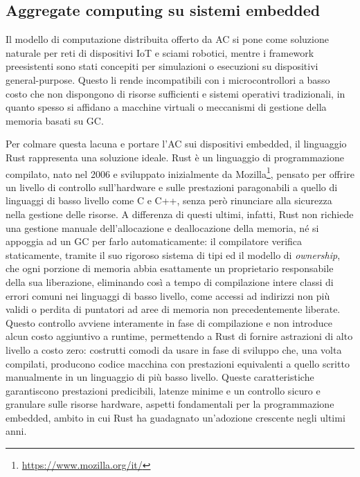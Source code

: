 \subsection{Aggregate computing su sistemi embedded}
\label{ssec:ac-on-embedded-devices}

Il modello di computazione distribuita offerto da \ac{AC} si pone come soluzione
naturale per reti di dispositivi \ac{IoT} e sciami robotici, mentre i framework
preesistenti sono stati concepiti per simulazioni o esecuzioni su dispositivi
general-purpose.
Questo li rende incompatibili con i microcontrollori a basso costo che non dispongono
di risorse sufficienti e sistemi operativi tradizionali, in quanto spesso si
affidano a macchine virtuali o meccanismi di gestione della memoria basati su \ac{GC}.

Per colmare questa lacuna e portare l'\ac{AC} sui dispositivi embedded, il linguaggio
Rust rappresenta una soluzione ideale.
Rust è un linguaggio di programmazione compilato, nato nel 2006 e sviluppato
inizialmente da Mozilla\footnote{\url{https://www.mozilla.org/it/}}, pensato per
offrire un livello di controllo sull'hardware e sulle prestazioni paragonabili a
quello di linguaggi di basso livello come C e C++, senza però rinunciare alla sicurezza
nella gestione delle risorse.
A differenza di questi ultimi, infatti, Rust non richiede una gestione manuale
dell'allocazione e deallocazione della memoria, né si appoggia ad un \ac{GC}
per farlo automaticamente: il compilatore verifica staticamente, tramite il suo
rigoroso sistema di tipi ed il modello di \emph{ownership}, che ogni porzione di
memoria abbia esattamente un proprietario responsabile della sua liberazione,
eliminando così a tempo di compilazione intere classi di errori comuni nei
linguaggi di basso livello, come accessi ad indirizzi non più validi o perdita
di puntatori ad aree di memoria non precedentemente liberate.
Questo controllo avviene interamente in fase di compilazione e non introduce
alcun costo aggiuntivo a runtime, permettendo a Rust di fornire astrazioni di
alto livello a costo zero: costrutti comodi da usare in fase di sviluppo che,
una volta compilati, producono codice macchina con prestazioni equivalenti a
quello scritto manualmente in un linguaggio di più basso livello.
Queste caratteristiche garantiscono prestazioni predicibili, latenze minime e
un controllo sicuro e granulare sulle risorse hardware, aspetti fondamentali per
la programmazione embedded, ambito in cui Rust ha guadagnato un'adozione crescente
negli ultimi anni.

